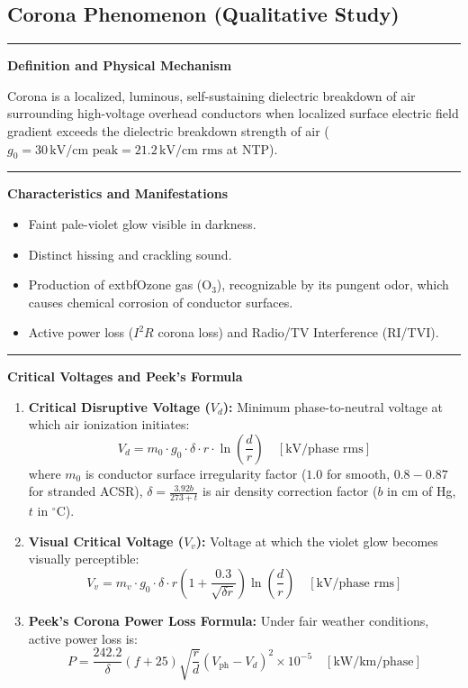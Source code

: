 \documentclass[11pt,a4paper]{article}
\newcommand{\concept}[1]{%
  \vspace{3pt}\noindent\textcolor{AnthGreen}{\rule{3.5pt}{10pt}}\enspace
  \textbf{\sffamily\color{AnthDark}#1}\par\vspace{2pt}%
}
\begin{document}
\subsection{Corona Phenomenon (Qualitative Study)}

\concept{Definition and Physical Mechanism}
Corona is a localized, luminous, self-sustaining dielectric breakdown of air surrounding high-voltage overhead conductors when localized surface electric field gradient exceeds the dielectric breakdown strength of air ($g_0 = 30\,\text{kV/cm peak} = 21.2\,\text{kV/cm rms}$ at NTP).

\concept{Characteristics and Manifestations}
\begin{itemize}
  \item Faint pale-violet glow visible in darkness.
  \item Distinct hissing and crackling sound.
  \item Production of 	extbf{Ozone gas ($\text{O}_3$)}, recognizable by its pungent odor, which causes chemical corrosion of conductor surfaces.
  \item Active power loss ($I^2 R$ corona loss) and Radio/TV Interference (RI/TVI).
\end{itemize}

\concept{Critical Voltages and Peek's Formula}
\begin{enumerate}
  \item \textbf{Critical Disruptive Voltage ($V_d$):} Minimum phase-to-neutral voltage at which air ionization initiates:
    \begin{equation}
      V_d = m_0 \cdot g_0 \cdot \delta \cdot r \cdot \ln\left(\frac{d}{r}\right) \quad [\text{kV/phase rms}]
    \end{equation}
    where $m_0$ is conductor surface irregularity factor ($1.0$ for smooth, $0.8-0.87$ for stranded ACSR), $\delta = \frac{3.92 b}{273 + t}$ is air density correction factor ($b$ in cm of Hg, $t$ in $^\circ\text{C}$).
  \item \textbf{Visual Critical Voltage ($V_v$):} Voltage at which the violet glow becomes visually perceptible:
    \begin{equation}
      V_v = m_v \cdot g_0 \cdot \delta \cdot r \left( 1 + \frac{0.3}{\sqrt{\delta r}} \right) \ln\left(\frac{d}{r}\right) \quad [\text{kV/phase rms}]
    \end{equation}
  \item \textbf{Peek's Corona Power Loss Formula:} Under fair weather conditions, active power loss is:
    \begin{equation}
      P = \frac{242.2}{\delta} (f + 25) \sqrt{\frac{r}{d}} (V_{\text{ph}} - V_d)^2 \times 10^{-5} \quad [\text{kW/km/phase}]
    \end{equation}
\end{enumerate}
\end{document}
